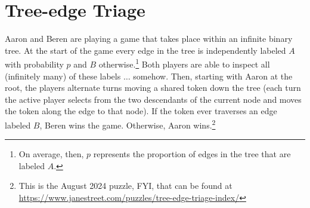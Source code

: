 \documentclass{book}
\begin{document}
\chapter{Tree-edge Triage}\label{statement}
\noindent Aaron and Beren are playing a game that takes place within an infinite binary tree. At the start of the game every edge in the tree is independently labeled $A$ with probability $p$  and $B$ otherwise.\footnote{On average, then, $p$ represents the proportion of edges in the tree that are labeled $A$.} Both players are able to inspect all (infinitely many) of these labels $\ldots$ somehow. Then, starting with Aaron at the root, the players alternate turns moving a shared token down the tree (each turn the active player selects from the two descendants of the current node and moves the token along the edge to that node). If the token ever traverses an edge labeled $B$, Beren wins the game. Otherwise, Aaron wins.\footnote{This is the August 2024 puzzle, FYI, that can be found at \url{https://www.janestreet.com/puzzles/tree-edge-triage-index/}}
\end{document}
